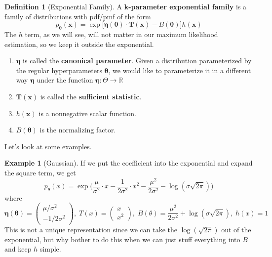 \documentclass{article}
\theoremstyle{definition}
\newtheorem{example}{Example}[section]
\newtheorem{definition}{Definition}[section]
\begin{document}
  \begin{definition}[Exponential Family]
  A \textbf{k-parameter exponential family} is a family of distributions with pdf/pmf of the form 
  \[p_{\boldsymbol{\theta}} (\mathbf{x}) = \exp\big[ \boldsymbol{\eta}(\boldsymbol{\theta}) \cdot \mathbf{T}(\mathbf{x}) - B(\boldsymbol{\theta}) \big] h(\mathbf{x})\]
  The $h$ term, as we will see, will not matter in our maximum likelihood estimation, so we keep it outside the exponential. 
  \begin{enumerate}
      \item $\boldsymbol{\eta}$ is called the \textbf{canonical parameter}. Given a distribution parameterized by the regular hyperparameters $\boldsymbol{\theta}$, we would like to parameterize it in a different way $\boldsymbol{\eta}$ under the function $\boldsymbol{\eta}: \Theta \rightarrow \mathbb{R}$

      \item $\mathbf{T}(\mathbf{x})$ is called the \textbf{sufficient statistic}. 

      \item $h(\mathbf{x})$ is a nonnegative scalar function. 

      \item $B(\boldsymbol{\theta})$ is the normalizing factor. 
  \end{enumerate}
  \end{definition}

  Let's look at some examples. 

  \begin{example}[Gaussian]
  If we put the coefficient into the exponential and expand the square term, we get 
  \[p_\theta (x) = \exp \bigg( \frac{\mu}{\sigma^2} \cdot x - \frac{1}{2\sigma^2} \cdot x^2 - \frac{\mu^2}{2 \sigma^2} - \log ( \sigma \sqrt{2 \pi}) \bigg)\] 
  where 
  \[\boldsymbol{\eta}(\boldsymbol{\theta}) = \begin{pmatrix} \mu /\sigma^2 \\ -1 / 2 \sigma^2 \end{pmatrix}, \; T(x) = \begin{pmatrix} x \\ x^2 \end{pmatrix}, \; B(\theta) = \frac{\mu^2}{2 \sigma^2} + \log(\sigma \sqrt{2 \pi}), \; h(x) = 1\]
  This is not a unique representation since we can take the $\log(\sqrt{2 \pi})$ out of the exponential, but why bother to do this when we can just stuff everything into $B$ and keep $h$ simple. 
  \end{example}
\end{document}
